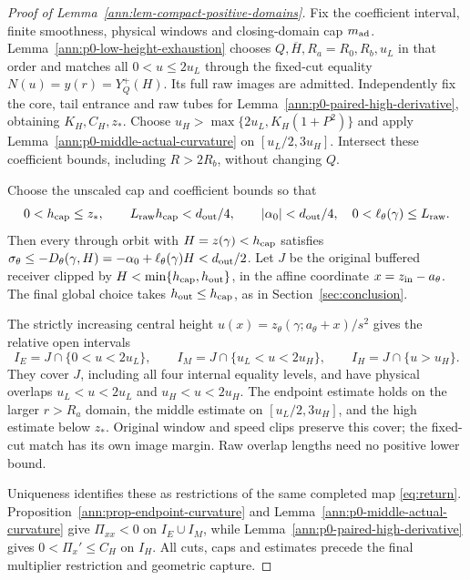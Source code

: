 \begin{proof}[Proof of Lemma~\ref{ann:lem-compact-positive-domains}]
Fix the coefficient interval, finite smoothness, physical windows and
closing-domain cap \(m_{\rm ad}\). Lemma~\ref{ann:p0-low-height-exhaustion}
chooses \(Q,\overline H,R_a=R_0,R_b,u_L\) in that order and matches
all \(0<u\le2u_L\) through the fixed-cut equality
\(N(u)=y(r)=Y_Q^+(H)\). Its full raw images are admitted.
Independently fix the core, tail entrance and raw tubes for
Lemma~\ref{ann:p0-paired-high-derivative}, obtaining \(K_H,C_H,z_*\).
Choose \(u_H>\max\{2u_L,K_H(1+P^2)\}\) and apply
Lemma~\ref{ann:p0-middle-actual-curvature} on \([u_L/2,3u_H]\).
Intersect these coefficient bounds, including \(R>2R_b\), without
changing \(Q\).

Choose the unscaled cap and coefficient bounds so that
\[
 0<h_{\rm cap}\le z_*,\qquad
 L_{\rm raw}h_{\rm cap}<d_{\rm out}/4,\qquad
 |\alpha_0|<d_{\rm out}/4,
 \quad 0<\ell_\theta(\gamma)\le L_{\rm raw}.
\]
Then every through orbit with \(H=z(\gamma)<h_{\rm cap}\) satisfies
\(\sigma_\theta\le-D_\theta(\gamma,H)
=-\alpha_0+\ell_\theta(\gamma)H<d_{\rm out}/2\).
Let \(J\) be the original buffered receiver clipped by
\(H<\min\{h_{\rm cap},h_{\rm out}\}\), in the affine coordinate
\(x=z_{\rm in}-a_\theta\). The final global choice takes
\(h_{\rm out}\le h_{\rm cap}\), as in Section~\ref{sec:conclusion}.

The strictly increasing central height
\(u(x)=z_\theta(\gamma;a_\theta+x)/s^2\) gives the relative open
intervals
\[
 I_E=J\cap\{0<u<2u_L\},\qquad
 I_M=J\cap\{u_L<u<2u_H\},\qquad
 I_H=J\cap\{u>u_H\}.
\]
They cover \(J\), including all four internal equality levels, and
have physical overlaps \(u_L<u<2u_L\) and \(u_H<u<2u_H\).
The endpoint estimate holds on the larger \(r>R_a\) domain, the
middle estimate on \([u_L/2,3u_H]\), and the high estimate below
\(z_*\). Original window and speed clips preserve this cover; the
fixed-cut match has its own image margin. Raw overlap lengths need no
positive lower bound.

Uniqueness identifies these as restrictions of the same completed map
\eqref{eq:return}. Proposition~\ref{ann:prop-endpoint-curvature} and
Lemma~\ref{ann:p0-middle-actual-curvature} give \(\Pi_{xx}<0\) on
\(I_E\cup I_M\), while
Lemma~\ref{ann:p0-paired-high-derivative} gives
\(0<\Pi_x'\le C_H\) on \(I_H\). All cuts, caps and estimates
precede the final multiplier restriction and geometric capture.
\end{proof}
